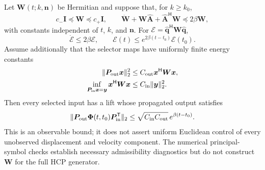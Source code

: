 Let $\boldsymbol W(t;k,\boldsymbol n)$ be Hermitian and suppose that, for $k\ge k_0$,
\begin{equation}
 c_-\boldsymbol I\preceq\boldsymbol W\preceq c_+\boldsymbol I,
 \qquad
 \dot{\boldsymbol W}+\boldsymbol W\widehat{\boldsymbol A}
 +\widehat{\boldsymbol A}^{\mathsf H}\boldsymbol W
 \preceq2\beta\boldsymbol W,
 \label{eq:app_symmetrizer_hypothesis}
\end{equation}
with constants independent of $t$, $k$, and $\boldsymbol n$. For
$\mathcal E=\widehat{\boldsymbol q}^{\mathsf H}
\boldsymbol W\widehat{\boldsymbol q}$,
\begin{equation}
 \dot{\mathcal E}\le2\beta\mathcal E,
 \qquad
 \mathcal E(t)\le e^{2\beta(t-t_0)}\mathcal E(t_0).
 \label{eq:app_energy_growth}
\end{equation}
Assume additionally that the selector maps have uniformly finite energy constants
\begin{align}
 \|\boldsymbol P_{\rm out}\boldsymbol x\|_2^2
 &\le C_{\rm out}\boldsymbol x^{\mathsf H}\boldsymbol W\boldsymbol x,
 \label{eq:app_output_energy}\\
 \inf_{\boldsymbol P_{\rm in}\boldsymbol x=\boldsymbol y}
 \boldsymbol x^{\mathsf H}\boldsymbol W\boldsymbol x
 &\le C_{\rm in}\|\boldsymbol y\|_2^2.
 \label{eq:app_input_energy}
\end{align}
Then every selected input has a lift whose propagated output satisfies
\begin{equation}
 \|\boldsymbol P_{\rm out}\boldsymbol\Phi(t,t_0)
 \boldsymbol P_{\rm in}^{\mathsf T}\|_2
 \le\sqrt{C_{\rm in}C_{\rm out}}\,
 e^{\beta(t-t_0)}.
 \label{eq:app_uniform_observable_bound}
\end{equation}
This is an observable bound; it does not assert uniform Euclidean control of every unobserved displacement and velocity component. The numerical principal-symbol checks establish necessary admissibility diagnostics but do not construct $\boldsymbol W$ for the full HCP generator.
